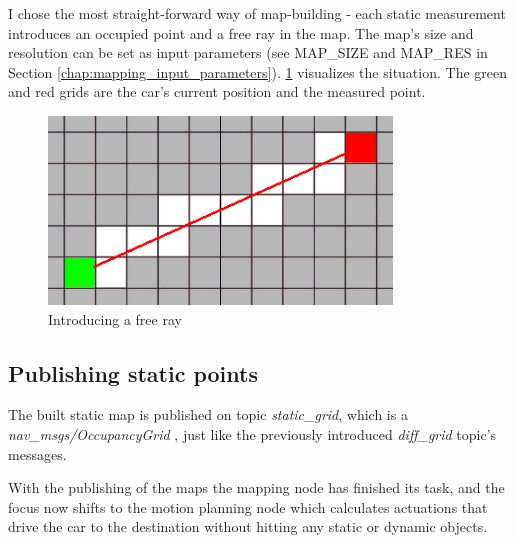 I chose the most straight-forward way of map-building - each static measurement introduces an occupied point and a free ray in the map. The map's size and resolution can be set as input parameters (see MAP\_SIZE and MAP\_RES in Section \ref{chap:mapping_input_parameters}). \ref{map_ray} visualizes the situation. The green and red grids are the car's current position and the measured point.

\begin{figure}[!ht]
    \centering
    \includegraphics[height=50mm]{figures/raw/map_ray.png}
    \caption{Introducing a free ray}
    \label{map_ray}
\end{figure}

\subsection{Publishing static points}
\label{chap:publishing_static_points}
The built static map is published on topic \textit{static\_grid}, which is a \textit{nav\_msgs/OccupancyGrid} \cite{ros_msg_OccupancyGrid}, just like the previously introduced \textit{diff\_grid} topic's messages.

With the publishing of the maps the mapping node has finished its task, and the focus now shifts to the motion planning node which calculates actuations that drive the car to the destination without hitting any static or dynamic objects.